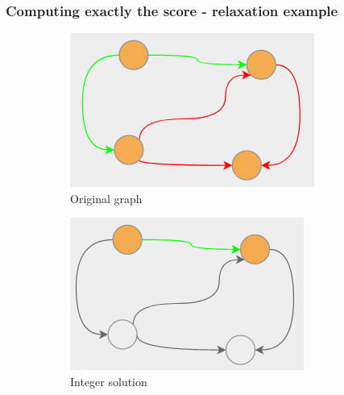\documentclass{beamer}
\begin{document}
\begin{frame}[c]
	\frametitle{Computing exactly the score - relaxation example}
	\begin{figure}
		\begin{center}
			\begin{subfigure}[b]{0.3\textwidth}
				\centering
				\includegraphics[width=\textwidth]{img/graph-example2-1.png}
				\caption{Original graph}
				\label{fig:img/graph-example2-1.png}
			\end{subfigure}
			\begin{subfigure}[b]{0.3\textwidth}
				\centering
				\includegraphics[width=\textwidth]{img/graph-example2-2.png}
				\caption{Integer solution}
				\label{fig:img/graph-example2-2.png}
			\end{subfigure}
			\begin{subfigure}[b]{0.3\textwidth}
				\centering

\end{subfigure}
\end{center}
\end{figure}
\end{frame}
\end{document}
